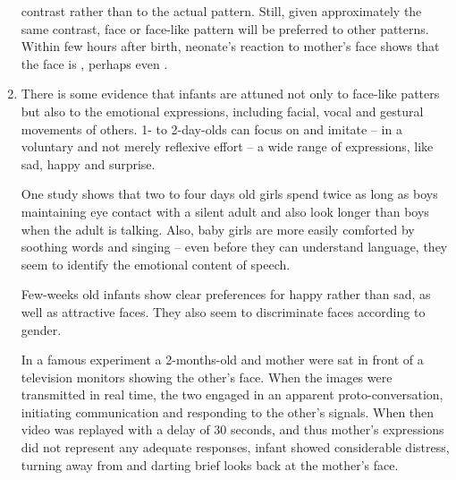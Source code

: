 \begin{enumerate}
  contrast rather than to the actual pattern. Still, given
  approximately the same contrast, face or face-like pattern will be preferred
  to other patterns. Within few hours after birth, neonate's reaction to
  mother's face shows that the face is , perhaps even
  .
\item\label{it:comm} There is some evidence that infants are attuned not only to
  face-like patters but also to the emotional expressions, including facial,
  vocal and gestural movements of others. 1- to 2-day-olds
  can focus on and imitate -- in a voluntary and not merely reflexive effort --
  a wide range of expressions, like sad, happy and
  surprise.
  
  One study shows that two to four days old girls spend twice as long as boys
  maintaining eye contact with a silent adult and also look longer than boys
  when the adult is talking. Also, baby girls are more easily comforted by
  soothing words and singing -- even before they can understand language, they
  seem to identify the emotional content of
  speech.
  
  Few-weeks old infants show clear preferences for happy rather than sad, as
  well as attractive faces. They also seem to discriminate faces
  according to gender.
  
  In a famous experiment a 2-months-old and
  mother were sat in front of a television monitors showing the other's face.
  When the images were transmitted in real time, the two engaged in an apparent
  proto-conversation, initiating communication and responding to the other's
  signals. When then video was replayed with a delay of 30 seconds, and thus
  mother's expressions did not represent any adequate responses, infant showed
  considerable distress, turning away from and darting brief looks back at the
  mother's face.
\end{enumerate}
